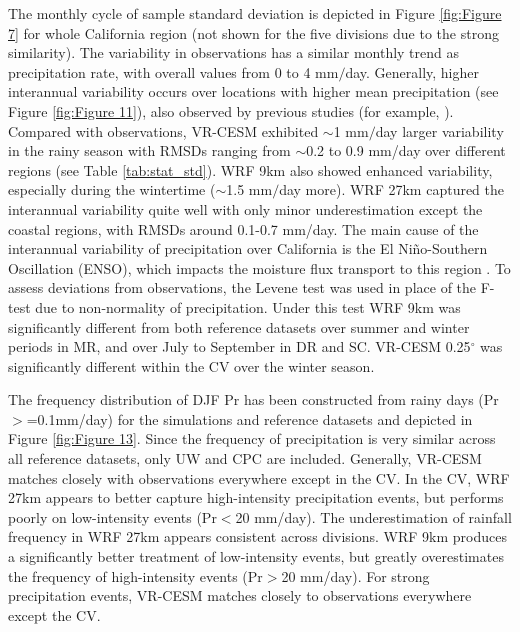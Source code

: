 \documentclass[draft,ms]{agutex}   %
\begin{document}
\begin{article}
The monthly cycle of sample standard deviation is depicted in Figure \ref{fig:Figure 7} for whole California region (not shown for the five divisions due to the strong similarity). The variability in observations has a similar monthly trend as precipitation rate, with overall values from 0 to 4 mm$/$day.  Generally, higher interannual variability occurs over locations with higher mean precipitation (see Figure \ref{fig:Figure 11}), also observed by previous studies (for example, \cite{duffy2006simulations}). Compared with observations, VR-CESM exhibited $\sim$1 mm$/$day larger variability in the rainy season with RMSDs ranging from $\sim$0.2 to 0.9 mm/day over different regions (see Table \ref{tab:stat_std}). WRF 9km also showed enhanced variability, especially during the wintertime ($\sim$1.5 mm$/$day more). WRF 27km captured the interannual variability quite well with only minor underestimation except the coastal regions, with RMSDs around 0.1-0.7 mm/day. The main cause of the interannual variability of precipitation over California is the El Ni\~{n}o-Southern Oscillation (ENSO), which impacts the moisture flux transport to this region \citep{cayan1998decadal, cayan1999enso, leung2003hydroclimate2}. To assess deviations from observations, the Levene test was used in place of the F-test due to non-normality of precipitation. Under this test WRF 9km was significantly different from both reference datasets over summer and winter periods in MR, and over July to September in DR and SC. VR-CESM 0.25$^\circ$ was significantly different within the CV over the  winter season.

The frequency distribution of DJF Pr has been constructed from rainy days (Pr$>$=0.1mm/day) for the simulations and reference datasets and depicted in Figure \ref{fig:Figure 13}.  Since the frequency of precipitation is very similar across all reference datasets, only UW and CPC are included. Generally, VR-CESM matches closely with observations everywhere except in the CV. In the CV, WRF 27km appears to better capture high-intensity precipitation events, but performs poorly on low-intensity events (Pr$<$20 mm/day). The underestimation of rainfall frequency in WRF 27km appears consistent across divisions. WRF 9km produces a significantly better treatment of low-intensity events, but greatly overestimates the frequency of high-intensity events (Pr$>$20 mm/day). For strong precipitation events, VR-CESM matches closely to observations everywhere except the CV.


\end{article}
\end{document}
